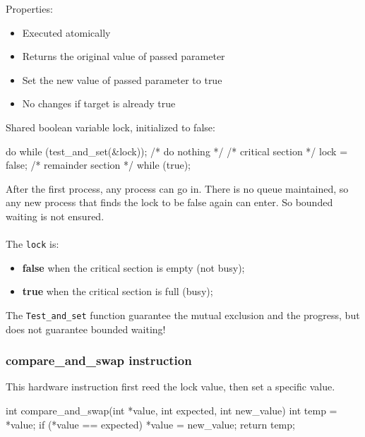 Properties:

\begin{itemize}
    \item Executed atomically
    \item Returns the original value of passed parameter
    \item Set the new value of passed parameter to true
    \item No changes if target is already true
\end{itemize}

Shared boolean variable lock, initialized to false:

\begin{codeInC}
do {
    while (test_and_set(&lock)); /* do nothing */
    /* critical section */
    lock = false;
    /* remainder section */
} while (true);

\end{codeInC}

After the first process, any process can go in. There is no
queue maintained, so any new process that finds the lock to
be false again can enter. So bounded waiting is not
ensured.

\paragraph{}
The \verb|lock| is:

\begin{itemize}
    \item \textbf{false} when the critical section is empty (not busy);
    \item \textbf{true} when the critical section is full (busy);
\end{itemize}

The \verb|Test_and_set| function guarantee the mutual exclusion and the progress, but does not guarantee bounded waiting!


\subsubsection{compare\_and\_swap instruction}
This hardware instruction first reed the lock value, then set a specific value.

\begin{codeInC}
int compare_and_swap(int *value, int expected, int new_value) {
    int temp = *value;
    if (*value == expected)
    *value = new_value;
    return temp;
} 

\end{codeInC}

